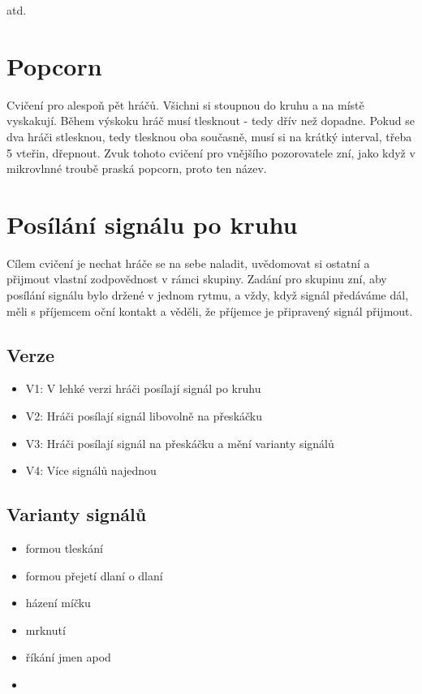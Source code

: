 atd. 
 
 
 
\needspace{5cm} \section{Popcorn} \label{popcorn} Cvičení pro alespoň pět hráčů. Všichni si stoupnou do kruhu a na místě vyskakují. Během výskoku hráč musí tlesknout - tedy dřív než dopadne. Pokud se dva hráči stlesknou, tedy tlesknou oba současně, musí si na krátký interval, třeba 5 vteřin, dřepnout. Zvuk tohoto cvičení pro vnějšího pozorovatele zní, jako když v mikrovlnné troubě praská popcorn, proto ten název. 
 
 
 
 
 
\needspace{5cm} \section{Posílání signálu po kruhu} \label{posílání signálu po kruhu} Cílem cvičení je nechat hráče se na sebe naladit, uvědomovat si ostatní a přijmout vlastní zodpovědnost v rámci skupiny. Zadání pro skupinu zní, aby posílání signálu bylo držené v jednom rytmu, a vždy, když signál předáváme dál, měli s příjemcem oční kontakt a věděli, že příjemce je připravený signál přijmout. 
 
\subsection{  Verze } \begin{itemize}
\item  V1: V lehké verzi hráči posílají signál po kruhu
\item  V2: Hráči posílají signál libovolně na přeskáčku
\item  V3: Hráči posílají signál na přeskáčku a mění varianty signálů
\item  V4: Více signálů najednou
\end{itemize}
 
\subsection{ Varianty signálů } \begin{itemize}
\item  formou tleskání
\item  formou přejetí dlaní o dlaní
\item  házení míčku
\item  mrknutí
\item  říkání jmen apod
\item  {}
\end{itemize}
 

